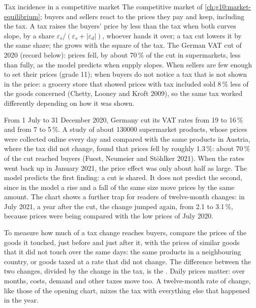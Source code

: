\begin{model}{Tax incidence in a competitive market}
\assumes The competitive market of \cref{ch:g10:market-equilibrium}; buyers and sellers react to the prices they pay and keep, including the tax.
\predicts A tax raises the buyers' price by less than the tax when both curves slope, by a share $\varepsilon_s/(\varepsilon_s + |\varepsilon_d|)$, whoever hands it over; a tax cut
  lowers it by the same share; the  grows with the square of the tax.
\tested The German VAT cut of 2020 (record below): prices fell, by about 70\,\% of the cut in supermarkets, less than fully, as the model predicts when supply slopes.
\breaks When sellers are few enough to set their prices (grade 11); when buyers do not notice a tax that is not shown in the price: a grocery store that showed prices with tax
  included sold 8\,\% less of the goods concerned (Chetty, Looney and Kroft 2009), so the same tax worked differently depending on how it was shown.
\end{model}

\begin{record}
From 1 July to 31 December 2020, Germany cut its VAT rates from 19 to 16\,\% and from 7 to 5\,\%. A study of about \num{130000} supermarket products, whose prices were collected
online every day and compared with the same products in Austria, where the tax did not change, found that prices fell by roughly 1.3\,\%: about 70\,\% of the cut reached buyers
(Fuest, Neumeier and Stöhlker 2021). When the rates went back up in January 2021, the price effect was only about half as large. The model predicts the first finding: a cut is
shared. It does not predict the second, since in the model a rise and a fall of the same size move prices by the same amount. The chart shows a further trap for readers of
twelve-month changes: in July 2021, a year after the cut, the change jumped again, from 2.1 to 3.1\,\%, because prices were being compared with the low prices of July 2020.
\end{record}

\begin{measure}
To measure how much of a tax change reaches buyers, compare the prices of the goods it touched, just before and just after it, with the prices of similar goods that it did not
touch over the same days: the same products in a neighbouring country, or goods taxed at a rate that did not change. The difference between the two changes, divided by the change in
the tax, is the . Daily prices matter: over months, costs, demand and other taxes move too. A twelve-month rate of change, like those of the opening chart, mixes the
tax with everything else that happened in the year.
\end{measure}

